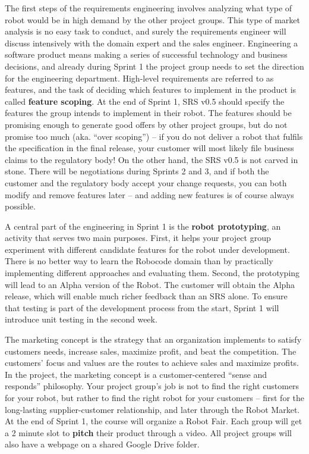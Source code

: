 \documentclass{scrreprt}
\begin{document}
The first steps of the requirements engineering involves analyzing what type of robot would be in high demand by the other project groups. This type of market analysis is no easy task to conduct, and surely the requirements engineer will discuss intensively with the domain expert and the sales engineer. Engineering a software product means making a series of successful technology and business decisions, and already during Sprint 1 the project group needs to set the direction for the engineering department. High-level requirements are referred to as features, and the task of deciding which features to implement in the product is called \textbf{feature scoping}. At the end of Sprint 1, SRS v0.5 should specify the features the group intends to implement in their robot. The features should be promising enough to generate good offers by other project groups, but do not promise too much (aka. ``over scoping'') -- if you do not deliver a robot that fulfils the specification in the final release, your customer will most likely file business claims to the regulatory body! On the other hand, the SRS v0.5 is not carved in stone. There will be negotiations during Sprints 2 and 3, and if both the customer and the regulatory body accept your change requests, you can both modify and remove features later -- and adding new features is of course always possible.

A central part of the engineering in Sprint 1 is the \textbf{robot prototyping}, an activity that serves two main purposes. First, it helps your project group experiment with different candidate features for the robot under development. There is no better way to learn the Robocode domain than by practically implementing different approaches and evaluating them. Second, the prototyping will lead to an Alpha version of the Robot. The customer will obtain the Alpha release, which will enable much richer feedback than an SRS alone. To ensure that testing is part of the development process from the start, Sprint 1 will introduce unit testing in the second week.

The marketing concept is the strategy that an organization implements to satisfy customers needs, increase sales, maximize profit, and beat the competition. The customers' focus and values are the routes to achieve sales and maximize profits. In the project, the marketing concept is a customer-centered ``sense and responds'' philosophy. Your project group's job is not to find the right customers for your robot, but rather to find the right robot for your customers -- first for the long-lasting supplier-customer relationship, and later through the Robot Market. At the end of Sprint 1, the course will organize a Robot Fair. Each group will get a 2 minute slot to \textbf{pitch} their product through a video. All project groups will also have a webpage on a shared Google Drive folder.
\end{document}
